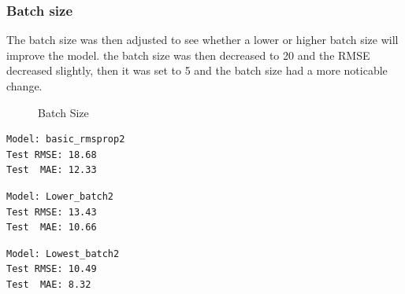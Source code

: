 ﻿\documentclass[10pt,11pt,12pt,oneside]{book}
\begin{document}
\subsubsection{Batch size}
The batch size was then adjusted to see whether a lower or higher batch size will improve the model. the batch size was then decreased to 20 and the RMSE decreased slightly, then it was set to 5 and the batch size had a more noticable change.\\
\begin{figure}[H]
    \centering
    \qquad
    \caption{Batch Size}%
    \label{fig:batch}%
\end{figure}
\begin{multicols}{3}
\centering
\begin{verbatim}
Model: basic_rmsprop2
Test RMSE: 18.68
Test  MAE: 12.33
\end{verbatim}
\begin{verbatim}
Model: Lower_batch2
Test RMSE: 13.43
Test  MAE: 10.66
\end{verbatim}
\begin{verbatim}
Model: Lowest_batch2
Test RMSE: 10.49
Test  MAE: 8.32
\end{verbatim}
\end{multicols}
\pagebreak
\end{document}
